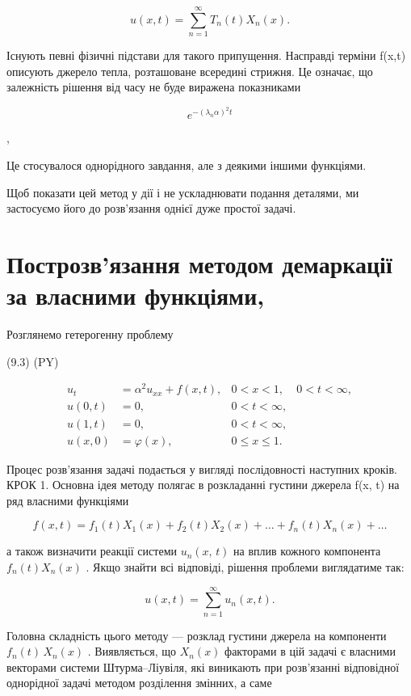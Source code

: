 \documentclass[
  ukrainian,
]{article}
\begin{document}
\[
u(x, t) = \sum_{n=1}^{\infty} T_n(t) X_n(x).
\]

Існують певні фізичні підстави для такого припущення. Насправді терміни
f(x,t) описують джерело тепла, розташоване всередині стрижня. Це
означає, що залежність рішення від часу не буде виражена показниками

\[
e^{-(\lambda_n\alpha)^2 t}
\]

,

Це стосувалося однорідного завдання, але з деякими іншими функціями.

Щоб показати цей метод у дії і не ускладнювати подання деталями, ми
застосуємо його до розв'язання однієї дуже простої задачі.

\section{Построзв'язання методом демаркації за власними
функціями,}\label{ux43fux43eux441ux442ux440ux43eux437ux432ux44fux437ux430ux43dux43dux44f-ux43cux435ux442ux43eux434ux43eux43c-ux434ux435ux43cux430ux440ux43aux430ux446ux456ux457-ux437ux430-ux432ux43bux430ux441ux43dux438ux43cux438-ux444ux443ux43dux43aux446ux456ux44fux43cux438}

Розглянемо гетерогенну проблему

(9.3) (PY)

\[
\begin{aligned} u_t &= \alpha^2 u_{xx} + f(x, t), & 0 < x < 1, & 0 < t < \infty, \\ u(0, t) &= 0, & 0 < t < \infty, \\ u(1, t) &= 0, & 0 < t < \infty, \\ u(x, 0) &= \varphi(x), & 0 \leqslant x \leqslant 1. \end{aligned}
\]

Процес розв'язання задачі подається у вигляді послідовності наступних
кроків. КРОК 1. Основна ідея методу полягає в розкладанні густини
джерела f(x, t) на ряд власними функціями

\[
f(x, t) = f_1(t) X_1(x) + f_2(t) X_2(x) + \dots + f_n(t) X_n(x) + \dots
\]

а також визначити реакції системи \(u_n\left(x,\,t\right)\) на вплив
кожного компонента \(f_n\left(t\right)X_n\left(x\right)\) . Якщо знайти
всі відповіді, рішення проблеми виглядатиме так:

\[
u(x, t) = \sum_{n=1}^{\infty} u_n(x, t).
\]

Головна складність цього методу --- розклад густини джерела на
компоненти \(f_n(t)\,X_n(x)\) . Виявляється, що \(X_n(x)\) факторами в
цій задачі є власними векторами системи Штурма--Ліувіля, які виникають
при розв'язанні відповідної однорідної задачі методом розділення
змінних, а саме
\end{document}
